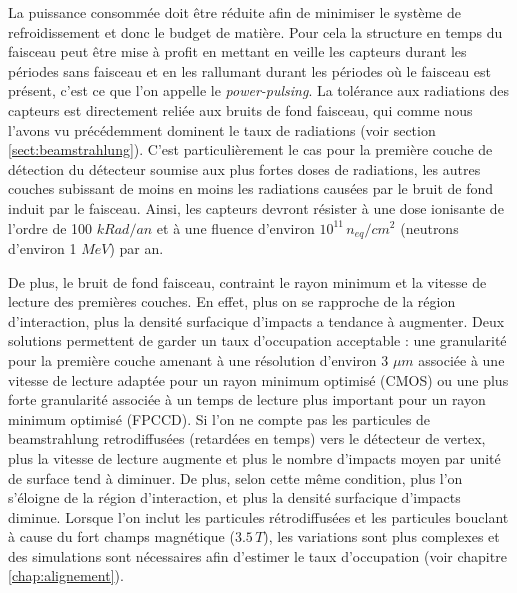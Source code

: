   La puissance consomm\'ee doit \^etre réduite afin de minimiser le syst\`eme de refroidissement et donc le budget de mati\`ere. Pour cela la structure en temps du faisceau peut \^etre mise \`a profit en mettant en veille les capteurs durant les périodes sans faisceau et en les rallumant durant les p\'eriodes où le faisceau est pr\'esent, c'est ce que l'on appelle le \textit{power-pulsing}. La tol\'erance aux radiations des capteurs est directement reli\'ee aux bruits de fond faisceau, qui comme nous l'avons vu pr\'ec\'edemment dominent le taux de radiations (voir section \ref{sect:beamstrahlung}). C'est particuli\`erement le cas pour la premi\`ere couche de d\'etection du d\'etecteur soumise aux plus fortes doses de radiations, les autres couches subissant de moins en moins les radiations caus\'ees par le bruit de fond induit par le faisceau. Ainsi, les capteurs devront r\'esister \`a une dose ionisante de l'ordre de 100 $kRad/an$ et \`a une fluence d'environ $10^{11} \, n_{eq}/cm^2$ (neutrons d'environ 1 $MeV$) par an.
  
  \medskip
  
  De plus, le bruit de fond faisceau, contraint le rayon minimum et la vitesse de lecture des premi\`eres couches. En effet, plus on se rapproche de la région d'interaction, plus la densit\'e surfacique d'impacts a tendance \`a augmenter. Deux solutions permettent de garder un taux d'occupation acceptable : une granularit\'e pour la premi\`ere couche amenant \`a une r\'esolution d'environ 3 $\mu m$ associ\'ee \`a une vitesse de lecture adapt\'ee pour un rayon minimum optimis\'e (CMOS) ou une plus forte granularit\'e associ\'ee \`a un temps de lecture plus important pour un rayon minimum optimis\'e (FPCCD). Si l'on ne compte pas les particules de beamstrahlung retrodiffus\'ees (retard\'ees en temps) vers le d\'etecteur de vertex, plus la vitesse de lecture augmente et plus le nombre d'impacts moyen par unit\'e de surface tend \`a diminuer. De plus, selon cette m\^eme condition, plus l'on s'\'eloigne de la r\'egion d'interaction, et plus la densit\'e surfacique d'impacts diminue. Lorsque l'on inclut les particules r\'etrodiffus\'ees et les particules bouclant \`a cause du fort champs magn\'etique ($3.5 \, T$), les variations sont plus complexes et des simulations sont n\'ecessaires afin d'estimer le taux d'occupation (voir chapitre \ref{chap:alignement}).
  
  
